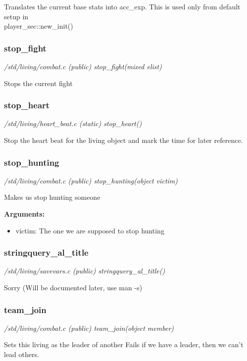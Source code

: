 Translates the current base stats into acc\_exp. This is used
only from default setup in \\ player\_sec::new\_init()


\subsubsection{stop\_fight}

{\em /std/living/combat.c (public) stop\_fight(mixed elist)}

Stops the current fight


\subsubsection{stop\_heart}

{\em /std/living/heart\_beat.c (static) stop\_heart()}

Stop the heart beat for the living object and mark
the time for later reference.


\subsubsection{stop\_hunting}

{\em /std/living/combat.c (public) stop\_hunting(object victim)}

Makes us stop hunting someone

{\bf Arguments:}
\begin{itemize}
\item     victim: The one we are supposed to stop hunting
\end{itemize}


\subsubsection{stringquery\_al\_title}

{\em /std/living/savevars.c (public) stringquery\_al\_title()}

Sorry (Will be documented later, use man -s)


\subsubsection{team\_join}

{\em /std/living/combat.c (public) team\_join(object member)}

Sets this living as the leader of another
Fails if we have a leader, then we can't lead others.

